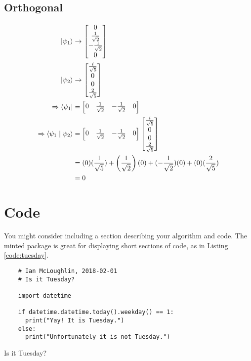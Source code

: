 \subsection{Orthogonal}

\begin{align}
\ket{\psi_1} &\rightarrow \begin{bmatrix} 0 \\ \frac{1}{\sqrt{2}} \\ -\frac{1}{\sqrt{2}} \\ 0 \end{bmatrix} \\
\ket{\psi_2} &\rightarrow \begin{bmatrix} \frac{i}{\sqrt{5}} \\ 0 \\ 0 \\ \frac{2}{\sqrt{5}} \end{bmatrix} \\
\Rightarrow \bra{\psi_1} &= \begin{bmatrix} 0 & \frac{1}{\sqrt{2}} & -\frac{1}{\sqrt{2}} & 0 \end{bmatrix} \\
\Rightarrow \braket{\psi_1 \mid \psi_2} &= \begin{bmatrix} 0 & \frac{1}{\sqrt{2}} & -\frac{1}{\sqrt{2}} & 0 \end{bmatrix} \begin{bmatrix} \frac{i}{\sqrt{5}} \\ 0 \\ 0 \\ \frac{2}{\sqrt{5}} \end{bmatrix} \\
&= (0)(\frac{1}{\sqrt{5}}) + \left(\frac{1}{\sqrt{2}}\right)(0) + (-\frac{1}{\sqrt{2}})(0) + (0)(\frac{2}{\sqrt{5}}) \\
&= 0
\end{align}


\section{Code}


You might consider including a section describing your algorithm and code.
The minted package is great for displaying short sections of code, as in 
Listing \ref{code:tuesday}.



\begin{listing}[H]
  \begin{verbatim}
    # Ian McLoughlin, 2018-02-01
    # Is it Tuesday?

    import datetime

    if datetime.datetime.today().weekday() == 1:
      print("Yay! It is Tuesday.")
    else:
      print("Unfortunately it is not Tuesday.")
  \end{verbatim}
  \caption{Is it Tuesday?}
  \label{code:tuesday}
\end{listing}

\lipsum[10-15]